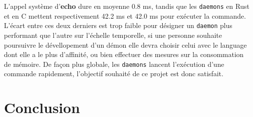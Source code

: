 \documentclass{article}
\begin{document}
L'appel système d'\textbf{echo} dure en moyenne 0.8 ms, tandis que les \texttt{daemons} en Rust et en C mettent respectivement 42.2 ms et 42.0 ms pour exécuter la commande. L'écart entre ces deux derniers est trop faible pour désigner un \texttt{daemon} plus performant que l'autre sur l'échelle temporelle, si une personne souhaite poursuivre le dévellopement d'un démon elle devra choisir celui avec le language dont elle a le plus d'affinité, ou bien effectuer des mesures sur la consommation de mémoire. De façon plus globale, les \texttt{daemons} lancent l'exécution d'une commande rapidement, l'objectif souhaité de ce projet est donc satisfait. 



\section{Conclusion}
\end{document}

